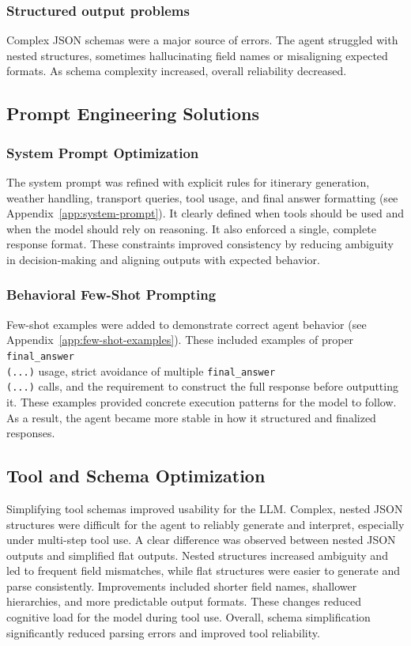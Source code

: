 \documentclass[fleqn,moreauthors,10pt]{ds_report}
\begin{document}
\subsubsection*{Structured output problems}
Complex JSON schemas were a major source of errors. The agent struggled with nested structures, sometimes hallucinating field names or misaligning expected formats. As schema complexity increased, overall reliability decreased.

\subsection*{Prompt Engineering Solutions}
\subsubsection*{System Prompt Optimization}
The system prompt was refined with explicit rules for itinerary generation, weather handling, transport queries, tool usage, and final answer formatting (see Appendix~\ref{app:system-prompt}). It clearly defined when tools should be used and when the model should rely on reasoning. It also enforced a single, complete response format. These constraints improved consistency by reducing ambiguity in decision-making and aligning outputs with expected behavior.

\subsubsection*{Behavioral Few-Shot Prompting}
Few-shot examples were added to demonstrate correct agent behavior (see Appendix~\ref{app:few-shot-examples}). These included examples of proper \texttt{final\_answer\\(...)} usage, strict avoidance of multiple \texttt{final\_answer\\(...)} calls, and the requirement to construct the full response before outputting it. These examples provided concrete execution patterns for the model to follow. As a result, the agent became more stable in how it structured and finalized responses.

\subsection*{Tool and Schema Optimization}
Simplifying tool schemas improved usability for the LLM. Complex, nested JSON structures were difficult for the agent to reliably generate and interpret, especially under multi-step tool use.
A clear difference was observed between nested JSON outputs and simplified flat outputs. Nested structures increased ambiguity and led to frequent field mismatches, while flat structures were easier to generate and parse consistently.
Improvements included shorter field names, shallower hierarchies, and more predictable output formats. These changes reduced cognitive load for the model during tool use. Overall, schema simplification significantly reduced parsing errors and improved tool reliability.
\end{document}
